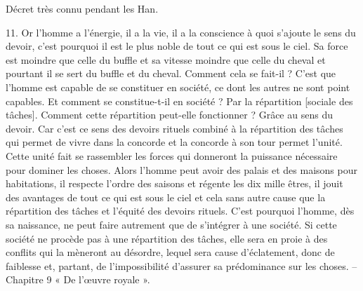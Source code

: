 Décret très connu pendant les Han. 



11.	Or l’homme a l’énergie, il a la vie, il a la conscience à quoi s’ajoute le sens du devoir, c’est pourquoi il est le plus noble de tout ce qui est sous le ciel. Sa force est moindre que celle du buffle et sa vitesse moindre que celle du cheval et pourtant il se sert du buffle et du cheval. Comment cela se fait-il ? C’est que l’homme est capable de se constituer en société, ce dont les autres ne sont point capables. Et comment se constitue-t-il en société ? Par la répartition [sociale des tâches]. Comment cette répartition peut-elle fonctionner ? Grâce au sens du devoir. Car c’est ce sens des devoirs rituels combiné à la répartition des tâches qui permet de vivre dans la concorde et la concorde à son tour permet l’unité. Cette unité fait se rassembler les forces qui donneront la puissance nécessaire pour dominer les choses. Alors l’homme peut avoir des palais et des maisons pour habitations, il respecte l’ordre des saisons et régente les dix mille êtres, il jouit des avantages de tout ce qui est sous le ciel et cela sans autre cause que la répartition des tâches et l’équité des devoirs rituels. C’est pourquoi l’homme, dès sa naissance, ne peut faire autrement que de s’intégrer à une société. Si cette société ne procède pas à une répartition des tâches, elle sera en proie à des conflits qui la mèneront au désordre, lequel sera cause d’éclatement, donc de faiblesse et, partant, de l’impossibilité d’assurer sa prédominance sur les choses.
-- Chapitre 9 « De l’œuvre royale ».
